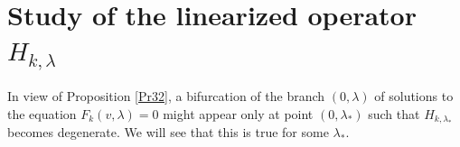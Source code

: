 \documentclass[reqno]{amsart}
\numberwithin{equation}{section}
\newenvironment{key words}{\textbf{Keywords}\mbox{  }}{ }
\begin{document}
\section{Study of the linearized operator $H_{k, \lambda}$}
\label{Section 5}

In view of Proposition \ref{Pr32}, a bifurcation of the branch $(0, \lambda)$ of solutions to the equation $F_k(v, \lambda)=0$ might appear only at point $(0,\lambda_{*})$ such that $H_{k, \lambda_{*}}$ becomes degenerate. We will see that this is true for some $\lambda_{*}$.




\medskip
\end{document}
